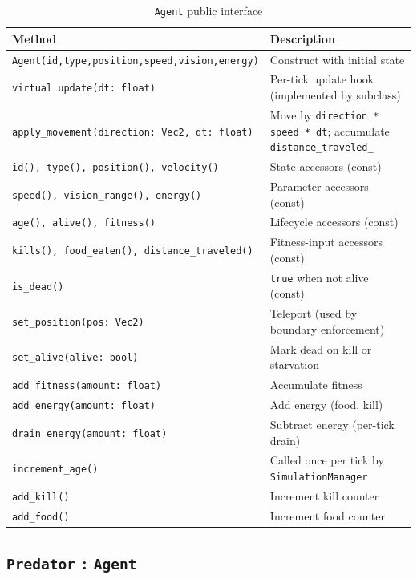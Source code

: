 \begin{table}[H]
\centering\small
\caption{\texttt{Agent} public interface}
\begin{tabularx}{\textwidth}{@{}lX@{}}
\toprule
\textbf{Method} & \textbf{Description} \\
\midrule
\texttt{Agent(id,type,position,speed,vision,energy)} & Construct with initial state \\
\texttt{virtual update(dt: float)} & Per-tick update hook (implemented by subclass) \\
\texttt{apply\_movement(direction: Vec2, dt: float)} & Move by \texttt{direction * speed * dt}; accumulate \texttt{distance\_traveled\_} \\
\midrule
\texttt{id(), type(), position(), velocity()} & State accessors (const) \\
\texttt{speed(), vision\_range(), energy()} & Parameter accessors (const) \\
\texttt{age(), alive(), fitness()} & Lifecycle accessors (const) \\
\texttt{kills(), food\_eaten(), distance\_traveled()} & Fitness-input accessors (const) \\
\texttt{is\_dead()} & \texttt{true} when not alive (const) \\
\midrule
\texttt{set\_position(pos: Vec2)} & Teleport (used by boundary enforcement) \\
\texttt{set\_alive(alive: bool)} & Mark dead on kill or starvation \\
\texttt{add\_fitness(amount: float)} & Accumulate fitness \\
\texttt{add\_energy(amount: float)} & Add energy (food, kill) \\
\texttt{drain\_energy(amount: float)} & Subtract energy (per-tick drain) \\
\texttt{increment\_age()} & Called once per tick by \texttt{SimulationManager} \\
\texttt{add\_kill()} & Increment kill counter \\
\texttt{add\_food()} & Increment food counter \\
\bottomrule
\end{tabularx}
\end{table}

\subsection{\texttt{Predator} : \texttt{Agent}}

